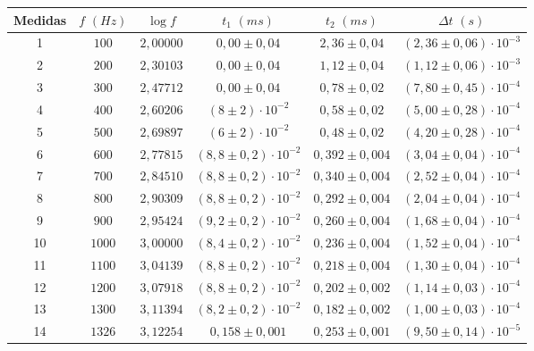 \documentclass[11pt]{report}
\begin{document}
\begin{refsection}
\begin{table}[H]
\centering
\begin{threeparttable}
\begin{tabular}{|c|c|c|c|c|c|}
\hline
Medidas \tnote{$\S$} & $f \hspace{4pt}(Hz)$ & $\log f$ & $t_1 \hspace{4pt}(ms)$ & $t_2 \hspace{4pt} (ms)$ &  $\Delta t\hspace{4pt} (s)$ \\
\hline
1 & $100$ & $2,00000$ & $0,00 \pm 0,04$ & $2,36 \pm 0,04$ & $(2,36 \pm 0,06) \cdot 10^{-3}$ \\
2 & $200$ & $2,30103$ & $0,00 \pm 0,04$ & $1,12 \pm 0,04$ & $(1,12 \pm 0,06) \cdot 10^{-3}$ \\
3 & $300$ & $2,47712$ & $0,00 \pm 0,04$ & $0,78 \pm 0,02$ & $(7,80 \pm 0,45) \cdot 10^{-4}$ \\
4 & $400$ & $2,60206$ & $(8 \pm 2) \cdot 10^{-2}$ & $0,58 \pm 0,02$ & $(5,00 \pm 0,28) \cdot 10^{-4}$ \\
5 & $500$ & $2,69897$ & $(6 \pm 2) \cdot 10^{-2}$ & $0,48 \pm 0,02$ & $(4,20 \pm 0,28) \cdot 10^{-4}$ \\
6 & $600$ & $2,77815$ & $(8,8 \pm 0,2) \cdot 10^{-2}$ & $0,392 \pm 0,004$ & $(3,04 \pm 0,04) \cdot 10^{-4}$ \\
7 & $700$ & $2,84510$ & $(8,8 \pm 0,2) \cdot 10^{-2}$ & $0,340 \pm 0,004$ & $(2,52 \pm 0,04) \cdot 10^{-4}$ \\
8 & $800$ & $2,90309$ & $(8,8 \pm 0,2) \cdot 10^{-2}$ & $0,292 \pm 0,004$ & $(2,04 \pm 0,04) \cdot 10^{-4}$ \\
9 & $900$ & $2,95424$ & $(9,2 \pm 0,2) \cdot 10^{-2}$ & $0,260 \pm 0,004$ & $(1,68 \pm 0,04) \cdot 10^{-4}$ \\
10 & $1000$ & $3,00000$ & $(8,4 \pm 0,2) \cdot 10^{-2}$ & $0,236 \pm 0,004$ & $(1,52 \pm 0,04) \cdot 10^{-4}$ \\
11 & $1100$ & $3,04139$ & $(8,8 \pm 0,2) \cdot 10^{-2}$ & $0,218 \pm 0,004$ & $(1,30 \pm 0,04) \cdot 10^{-4}$ \\
12 & $1200$ & $3,07918$ & $(8,8 \pm 0,2) \cdot 10^{-2}$ & $0,202 \pm 0,002$ & $(1,14 \pm 0,03) \cdot 10^{-4}$ \\
13 & $1300$ & $3,11394$ & $(8,2 \pm 0,2) \cdot 10^{-2}$ & $0,182 \pm 0,002$ & $(1,00 \pm 0,03) \cdot 10^{-4}$ \\
14 & $1326$ & $3,12254$ & $0,158 \pm 0,001$ & $0,253 \pm 0,001$ & $(9,50 \pm 0,14) \cdot 10^{-5}$ \\

\end{tabular}
\end{threeparttable}
\end{table}
\end{refsection}
\end{document}
